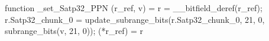 function _set_Satp32_PPN (r_ref, v) = {
    r = __bitfield_deref(r_ref);
    r.Satp32_chunk_0 = update_subrange_bits(r.Satp32_chunk_0, 21, 0, subrange_bits(v, 21, 0));
    (*r_ref) = r
}
